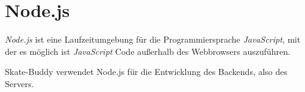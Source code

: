 \section{Node.js}

\textit{Node.js} ist eine Laufzeitumgebung für die Programmiersprache \textit{JavaScript}, mit der es möglich ist \textit{JavaScript} Code außerhalb des Webbrowsers auszuführen.

Skate-Buddy verwendet Node.js für die Entwicklung des Backends, also des Servers.